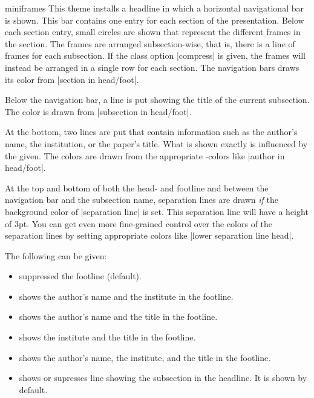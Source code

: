\begin{outerthemeexample}{miniframes}
  This theme installs a headline in which a horizontal navigational
  bar is shown. This bar contains one entry for each section of the
  presentation. Below each section entry, small circles are shown that
  represent the different frames in the section. The frames are
  arranged subsection-wise, that is, there is a line of frames for
  each subsection. If the class  option |compress| is given, the
  frames will instead be arranged in a single row for each
  section. The navigation bars draws its color from
  |section in head/foot|.

  Below the navigation bar, a line is put showing the title of the
  current subsection. The color is drawn from |subsection in head/foot|.

  At the bottom, two lines are put that contain information such as
  the author's name, the institution, or the paper's title. What is
  shown exactly is influenced by the  given. The colors
  are drawn from the appropriate \beamer-colors like
  |author in head/foot|.

  At the top and bottom of both the head- and footline and between the
  navigation bar and the subsection name, separation lines are drawn
  \emph{if} the background color of |separation line| is set. This
  separation line will have a height of 3pt. You can get even more
  fine-grained control over the colors of the separation lines by
  setting appropriate colors like |lower separation line head|.

  The following  can be given:
  \begin{itemize}
  \item {} suppressed the footline (default).
  \item {} shows the author's name
    and the institute in the footline.
  \item {} shows the author's name
    and the title in the footline.
  \item {} shows the institute
    and the title in the footline.
  \item {} shows the author's
    name, the institute, and the title in the footline.
  \item {} shows or supresses
    line showing the subsection in the headline. It is shown by
    default.
  \end{itemize}  
\end{outerthemeexample}

